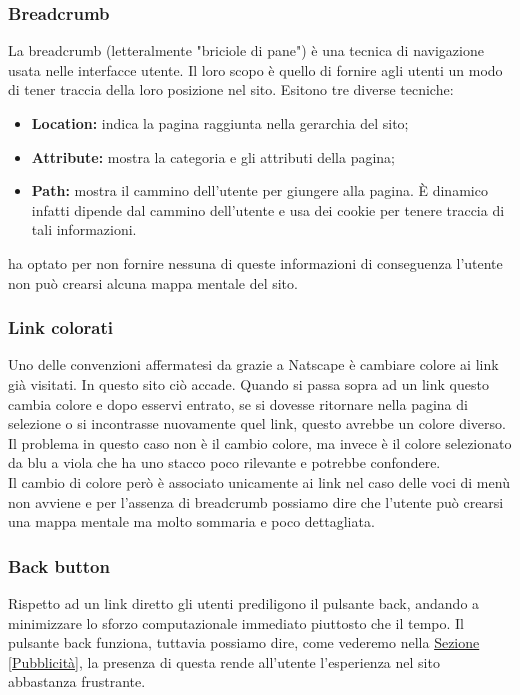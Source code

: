 \subsubsection{Breadcrumb}
La breadcrumb (letteralmente "briciole di pane") è una tecnica di navigazione usata nelle interfacce utente. Il loro scopo è quello di fornire agli utenti un modo di tener traccia della loro posizione nel sito. 
Esitono tre diverse tecniche:
\begin{itemize}
	\item \textbf{Location:} indica la pagina raggiunta nella gerarchia del sito;
	\item \textbf{Attribute:} mostra la categoria e gli attributi della pagina;
	\item \textbf{Path:} mostra il cammino dell'utente per giungere alla pagina. È dinamico infatti dipende dal cammino dell'utente e usa dei cookie per tenere traccia di tali informazioni.
\end{itemize}
\nomeSito ha optato per non fornire nessuna di queste informazioni di conseguenza l'utente non può crearsi alcuna mappa mentale del sito.

\subsubsection{Link colorati}
Uno delle convenzioni affermatesi da grazie a Natscape è cambiare colore ai link già visitati. In questo sito ciò accade. Quando si passa sopra ad un link questo cambia colore e dopo esservi entrato, se si dovesse ritornare nella pagina di selezione o si incontrasse nuovamente quel link, questo avrebbe un colore diverso. Il problema in questo caso non è il cambio colore, ma invece è il colore selezionato da blu a viola che ha uno stacco poco rilevante e potrebbe confondere.\\
Il cambio di colore però è associato unicamente ai link nel caso delle voci di menù non avviene e per l'assenza di breadcrumb possiamo dire che l'utente può crearsi una mappa mentale ma molto sommaria e poco dettagliata. 

\subsubsection{Back button}
Rispetto ad un link diretto gli utenti prediligono il pulsante back, andando a minimizzare lo sforzo computazionale immediato piuttosto che il tempo. Il pulsante back funziona, tuttavia possiamo dire, come vederemo nella \hyperref[Pubblicità]{Sezione \ref{Pubblicità}}, la presenza di questa rende all'utente l'esperienza nel sito abbastanza frustrante.